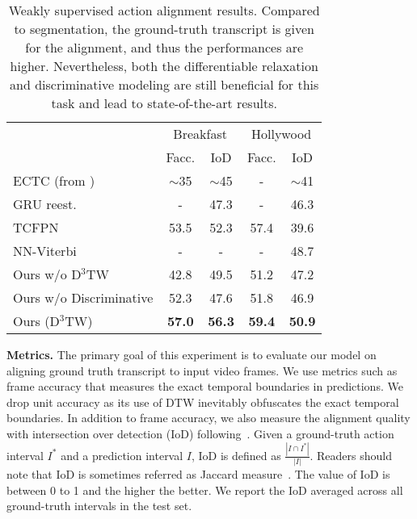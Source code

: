 \documentclass[10pt,twocolumn,letterpaper]{article}
\begin{document}
\begin{table}
\small
\begin{center}
\begin{tabular}{lcccc}
\toprule
& \multicolumn{2}{c}{Breakfast} & \multicolumn{2}{c}{Hollywood} \\
 & Facc.  & IoD & Facc. & IoD \\
\midrule
ECTC\cite{huang2016connectionist} (from \cite{ding2018weakly})  & $\sim$35  & $\sim$45 & - & $\sim$41 \\
GRU reest.\cite{richard2017weakly} & -  & 47.3 & - & 46.3 \\
TCFPN\cite{ding2018weakly} &53.5  & 52.3 & 57.4 &  39.6\\
NN-Viterbi\cite{richard2018neuralnetwork} & -  & - & - & 48.7\\
\hline
Ours w/o D${}^3$TW  & 42.8 & 49.5 & 51.2 & 47.2\\
Ours w/o Discriminative  & 52.3 & 47.6 & 51.8 & 46.9\\
Ours (D${}^3$TW) & {\bf 57.0} & {\bf 56.3} &{\bf 59.4} & {\bf 50.9}\\
\bottomrule
\end{tabular}
\end{center}
\caption{
Weakly supervised action alignment results. Compared to segmentation, the ground-truth transcript is given for the alignment, and thus the performances are higher. Nevertheless, both the differentiable relaxation and discriminative modeling are still beneficial for this task and lead to state-of-the-art results.
}
\vspace{-3mm}
\label{tab:aa}
\end{table}

{\noindent \bf  Metrics.} The primary goal of this experiment is to evaluate our model on aligning ground truth transcript to input video frames. We use metrics such as frame accuracy that measures the exact temporal boundaries in predictions. We drop unit accuracy as its use of DTW inevitably obfuscates the exact temporal boundaries. In addition to frame accuracy, we also measure the alignment quality with intersection over detection (IoD) following~\cite{bojanowski2014weakly}. Given a ground-truth action interval $I^*$ and a prediction interval $I$, IoD is defined as $\frac{|I \cap I^*|}{|I|}$. Readers should note that IoD is sometimes referred as Jaccard measure~\cite{bojanowski2014weakly,richard2018neuralnetwork}. The value of IoD is between 0 to 1 and the higher the better. We report the IoD averaged across all ground-truth intervals in the test set. 
\end{document}

